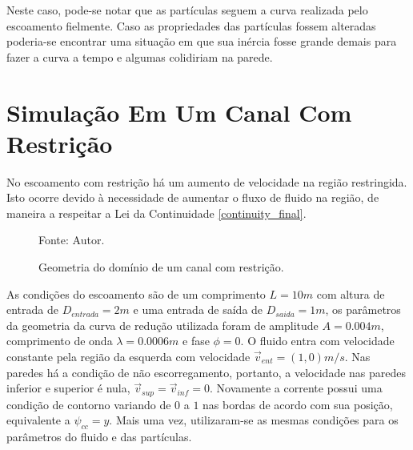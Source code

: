 Neste caso, pode-se notar que as partículas seguem a curva realizada pelo escoamento fielmente.
Caso as propriedades das partículas fossem alteradas poderia-se encontrar uma situação em que sua inércia fosse grande demais para fazer a curva a tempo e algumas colidiriam na parede. 

\section{\textbf{Simulação Em Um Canal Com Restrição}}
\label{sec_nozzle}
No escoamento com restrição há um aumento de velocidade na região restringida.
Isto ocorre devido à necessidade de aumentar o fluxo de fluido na região, de maneira a respeitar a Lei da Continuidade \eqref{continuity_final}.

\begin{figure}[H]
    \centering
     {\raggedleft \scriptsize Fonte: Autor.}
    \caption{Geometria do domínio de um canal com restrição.}
    \label{nozzle_geometry}
\end{figure}

As condições do escoamento são de um comprimento $L=10m$ com altura de entrada de $D_{entrada}=2m$ e uma entrada de saída de $D_{saida}=1m$, os parâmetros da geometria da curva de redução utilizada foram de amplitude $A=0.004m$, comprimento de onda $\lambda=0.0006m$ e fase $\phi=0$.
O fluido entra com velocidade constante pela região da esquerda com velocidade $\vec{v}_{ent}=(1, 0)m/s$.
Nas paredes há a condição de não escorregamento, portanto, a velocidade nas paredes inferior e superior é nula, $\vec{v}_{sup}=\vec{v}_{inf}=0$.
Novamente a corrente possui uma condição de contorno variando de $0$ a $1$ nas bordas de acordo com sua posição, equivalente a $\psi_{cc}=y$.
Mais uma vez, utilizaram-se as mesmas condições para os parâmetros do fluido e das partículas.

